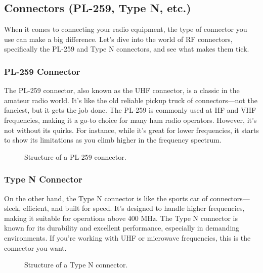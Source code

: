 \subsection{Connectors (PL-259, Type N, etc.)}
\label{subsec:connectors}

When it comes to connecting your radio equipment, the type of connector you use can make a big difference. Let's dive into the world of RF connectors, specifically the PL-259 and Type N connectors, and see what makes them tick.

\subsubsection*{PL-259 Connector}
The PL-259 connector, also known as the UHF connector, is a classic in the amateur radio world. It's like the old reliable pickup truck of connectors—not the fanciest, but it gets the job done. The PL-259 is commonly used at HF and VHF frequencies, making it a go-to choice for many ham radio operators. However, it's not without its quirks. For instance, while it's great for lower frequencies, it starts to show its limitations as you climb higher in the frequency spectrum.

\begin{figure}[h!]
    \centering
    \caption{Structure of a PL-259 connector.}
    \label{fig:pl259-structure}
\end{figure}

\subsubsection*{Type N Connector}
On the other hand, the Type N connector is like the sports car of connectors—sleek, efficient, and built for speed. It's designed to handle higher frequencies, making it suitable for operations above 400 MHz. The Type N connector is known for its durability and excellent performance, especially in demanding environments. If you're working with UHF or microwave frequencies, this is the connector you want.

\begin{figure}[h!]
    \centering
    \caption{Structure of a Type N connector.}
    \label{fig:typeN-structure}
\end{figure}

